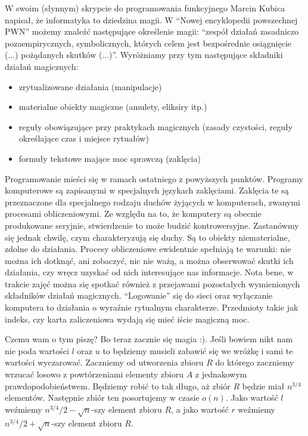 W swoim (słynnym) skrypcie do programowania funkcyjnego Marcin Kubica napisał, że informatyka to dziedzina magii.
W ``Nowej encyklopedii powszechnej PWN'' możemy znaleźć następujące określenie magii: ``zespół działań zasadniczo pozaempirycznych, symbolicznych, których celem jest bezpośrednie osiągnięcie (...) pożądanych skutków (...)''.
Wyróżniamy przy tym następujące składniki działań magicznych:
\begin{itemize}
 \item zrytualizowane działania (manipulacje)
 \item materialne obiekty magiczne (amulety, eliksiry itp.)
 \item reguły obowiązujące przy praktykach magicznych (zasady czystości, reguły określające czas i miejsce rytuałów)
 \item formuły tekstowe mające moc sprawczą (zaklęcia)
\end{itemize}
Programowanie mieści się w ramach ostatniego z powyższych punktów.
Programy komputerowe są zapisanymi w specjalnych językach zaklęciami.
Zaklęcia te są przeznaczone dla specjalnego rodzaju duchów żyjących w komputerach, zwanymi procesami obliczeniowymi.
Ze względu na to, że komputery są obecnie produkowane seryjnie, stwierdzenie to może budzić kontrowersyjne.
Zastanówmy się jednak chwilę, czym charakteryzują się duchy.
Są to obiekty niematerialne, zdolne do działania.
Procesy obliczeniowe ewidentnie spełniają te warunki: nie można ich dotknąć, ani zobaczyć, nic nie ważą, a można obserwować skutki ich działania, czy wręcz uzyskać od nich interesujące nas informacje.
Nota bene, w trakcie zajęć można się spotkać również z przejawami pozostałych wymienionych składników działań magicznych.
``Logowanie'' się do sieci oraz wyłączanie komputera to działania o wyraźnie rytualnym charakterze.
Przedmioty takie jak indeks, czy karta zaliczeniowa wydają się mieć iście magiczną moc.

Czemu wam o tym piszę?
Bo teraz zacznie się magia :).
Jeśli bowiem nikt nam nie poda wartości $l$ oraz $u$ to będziemy musieli zabawić się we wróżkę i sami te wartości wyczarować.
Zaczniemy od utworzenia zbioru $R$ do którego zaczniemy wrzucać losowo z powtórzeniami elementy zbioru $A$ z jednakowym prawdopodobieństwem.
Będziemy robić to tak długo, aż zbiór $R$ będzie miał $n^{3/4}$ elementów.
Następnie zbiór ten posortujemy w czasie $o(n)$.
Jako wartość $l$ weźmiemy $n^{3/4}/2 - \sqrt{n}$-szy element zbioru $R$, a jako wartość $r$ weźmiemy $n^{3/4}/2 + \sqrt{n}$-szy element zbioru $R$.

